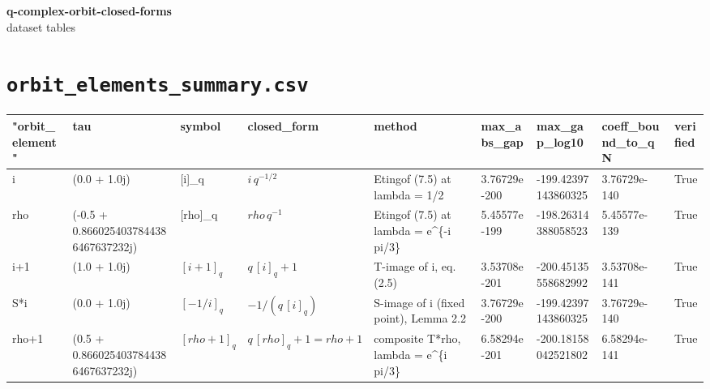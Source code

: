 \documentclass[10pt]{article}
\begin{document}
\begin{center}\Large\textbf{q-complex-orbit-closed-forms} \\ \normalsize dataset tables\end{center}
\vspace{1em}
\section*{\texttt{orbit\_elements\_summary.csv}}
{\footnotesize
\begin{longtable}{@{}lllllllll@{}}
\toprule
\textbf{﻿"orbit\_element"} & \textbf{tau} & \textbf{symbol} & \textbf{closed\_form} & \textbf{method} & \textbf{max\_abs\_gap} & \textbf{max\_gap\_log10} & \textbf{coeff\_bound\_to\_qN} & \textbf{verified} \\
\midrule\endhead
i & (0.0 + 1.0j) & [i]\_q & $i \, q^{-1/2}$ & Etingof (7.5) at lambda = 1/2 & 3.76729e-200 & -199.42397143860325 & 3.76729e-140 & True \\
rho & (-0.5 + 0.8660254037844386467637232j) & [rho]\_q & $rho \, q^{-1}$ & Etingof (7.5) at lambda = e\textasciicircum{}\{-i pi/3\} & 5.45577e-199 & -198.26314388058523 & 5.45577e-139 & True \\
i+1 & (1.0 + 1.0j) & $[i+1]_q$ & $q \, [i]_q + 1$ & T-image of i, eq. (2.5) & 3.53708e-201 & -200.45135558682992 & 3.53708e-141 & True \\
S*i & (0.0 + 1.0j) & $[-1/i]_q$ & $-1 / (q \, [i]_q)$ & S-image of i (fixed point), Lemma 2.2 & 3.76729e-200 & -199.42397143860325 & 3.76729e-140 & True \\
rho+1 & (0.5 + 0.8660254037844386467637232j) & $[rho+1]_q$ & $q \, [rho]_q + 1 = rho+1$ & composite T*rho, lambda = e\textasciicircum{}\{i pi/3\} & 6.58294e-201 & -200.18158042521802 & 6.58294e-141 & True \\
\bottomrule
\end{longtable}}
\end{document}
